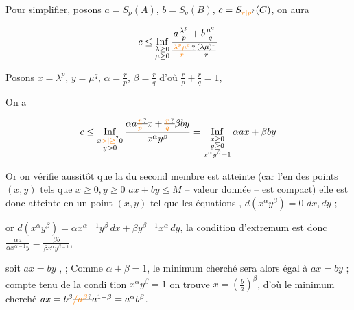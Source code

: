 
Pour simplifier, posons $a=S_p(A)$, $b=S_q(B)$, $c=S_{\unsure{r|p}}(C)$, on aura

\[
c\leq\mathop{\mathrm{Inf}}\limits_{\substack{\lambda\geq0\\\mu\geq0}}
\frac{a\frac{\lambda^p}{p}+b\frac{\mu^q}{q}}
{\deleted{\unsure{\frac{\lambda^p\mu^q}{r}}}\frac{(\lambda\mu)^r}{r}}
\]


Posons $x=\lambda^p$, $y=\mu^q$, $\alpha=\frac rp$, $\beta=\frac rq$ d'où \unsure{,} \uline{$\frac rp+\frac rq=1$},

On a

\[
c\leq\mathop{\mathrm{Inf}}\limits_{\substack{x\unsure{>|\geq}0\\y>0}}
\frac{\alpha a\deleted{\unsure{\frac rp}}x+\deleted{\unsure{\frac rq}}\beta by}{x^\alpha y^\beta}
=\mathop{\mathrm{Inf}}\limits_{\substack{x\geq0\\y\geq0\\x^\alpha y^\beta=1}}\alpha a x+\beta by
\]

Or on vérifie aussitôt que la  du second membre est atteinte (car l'en des points $(x,y)$ tels que $x\geq0,y\geq0$ $ax+by\leq M$ -- valeur donnée -- est compact) elle est donc atteinte en un point $(x,y)$ tel que les équations , $d(x^\alpha y^\beta)=0$   $dx,dy$  ;

or $d(x^\alpha y^\beta)=\alpha x^{\alpha-1}y^\beta\,dx+\beta y^{\beta-1}x^\alpha\,dy$,  la condition d'extremum est donc $\frac{\alpha a}{\alpha x^{\alpha-1}y}=\frac{\beta b}{\beta x^\alpha y^{\beta-1}}$,

soit $ax=by$ \deleted{\unsure{$=$}},   ;  Comme $\alpha+\beta=1$, le minimum cherché sera alors  égal à $ax=by$ ; compte tenu de la condi%
%
tion $x^\alpha y^\beta=1$ on trouve $x=\left(\frac ba\right)^\beta$, d'où  le minimum cherché $ax=b^\beta\deleted{\unsure{/a^\beta}}a^{1-\beta}=a^\alpha b^\beta$.

